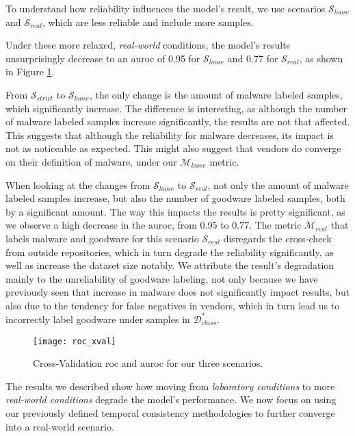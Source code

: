 To understand how reliability influences the model's result, we use scenarios $\mathcal{S}_{loose}$ and $\mathcal{S}_{real}$, which are less reliable and include more samples.

Under these more relaxed, \textit{real-world} conditions, the model's results unsurprisingly decrease to an \gls{auroc} of 0.95 for $\mathcal{S}_{loose}$ and 0.77 for $\mathcal{S}_{real}$, as shown in Figure \ref{fig:roc_xval}.

From $\mathcal{S}_{strict}$ to $\mathcal{S}_{loose}$, the only change is the amount of malware labeled samples, which significantly increase. The difference is interesting, as although the number of malware labeled samples increase significantly, the results are not that affected. This suggests that although the reliability for malware decreases, its impact is not as noticeable as expected. This might also suggest that vendors do converge on their definition of malware, under our $\mathcal{M}_{loose}$ metric.

When looking at the changes from $\mathcal{S}_{loose}$ to $\mathcal{S}_{real}$, not only the amount of malware labeled samples increase, but also the number of goodware labeled samples, both by a significant amount. The way this impacts the results is pretty significant, as we observe a high decrease in the \gls{auroc}, from 0.95 to 0.77. The metric $\mathcal{M}_{real}$ that labels malware and goodware for this scenario $\mathcal{S}_{real}$ disregards the cross-check from outside repositories, which in turn degrade the reliability significantly, as well as increase the dataset size notably. We attribute the result's degradation mainly to the unreliability of goodware labeling, not only because we have previously seen that increase in malware does not significantly impact results, but also due to the tendency for false negatives in vendors, which in turn lead us to incorrectly label goodware under samples in $\mathcal{D}_{class}^*$.

\begin{figure}[!h]
	\centering
	\texttt{[image: roc\_xval]}
	\caption{Cross-Validation \gls{roc} and \gls{auroc} for our three scenarios.}
	\label{fig:roc_xval}
\end{figure}

The results we described show how moving from \textit{laboratory conditions} to more \textit{real-world conditions} degrade the model's performance. We now focus on using our previously defined temporal consistency methodologies to further converge into a real-world scenario.

